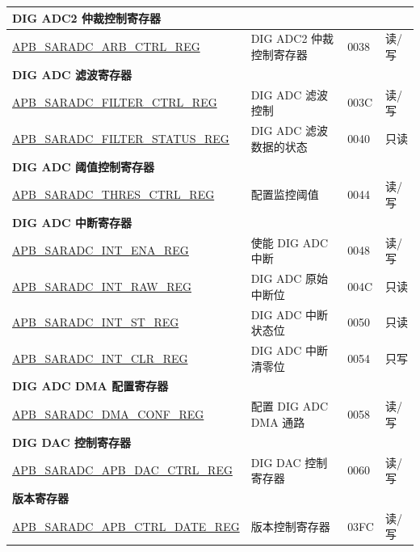 \begin{longtable}{ | p{6cm} | p{7.2cm} | p{1.3cm} | p{1cm} | }
\multicolumn{4}{|l|}{\textbf{DIG ADC2 仲裁控制寄存器}} \\ \hline
\hyperref[regdesc:APBSARADCAPBADCARBCTRLREG]{APB\_SARADC\_ARB\_CTRL\_REG} & DIG ADC2 仲裁控制寄存器 & \hexprefix{}0038 & 读/写 \\ \hline
\multicolumn{4}{|l|}{\textbf{DIG ADC 滤波寄存器}} \\ \hline
\hyperref[regdesc:APBSARADCFILTERCTRLREG]{APB\_SARADC\_FILTER\_CTRL\_REG} & DIG ADC 滤波控制 & \hexprefix{}003C & 读/写 \\ \hline
\hyperref[regdesc:APBSARADCFILTERSTATUSREG]{APB\_SARADC\_FILTER\_STATUS\_REG} & DIG ADC 滤波数据的状态 & \hexprefix{}0040 & 只读 \\ \hline
\multicolumn{4}{|l|}{\textbf{DIG ADC 阈值控制寄存器}} \\ \hline
\hyperref[regdesc:APBSARADCTHRESCTRLREG]{APB\_SARADC\_THRES\_CTRL\_REG} & 配置监控阈值 & \hexprefix{}0044 & 读/写 \\ \hline
\multicolumn{4}{|l|}{\textbf{DIG ADC 中断寄存器}} \\ \hline
\hyperref[regdesc:APBSARADCINTENAREG]{APB\_SARADC\_INT\_ENA\_REG} & 使能 DIG ADC 中断 & \hexprefix{}0048 & 读/写 \\ \hline
\hyperref[regdesc:APBSARADCINTRAWREG]{APB\_SARADC\_INT\_RAW\_REG} & DIG ADC 原始中断位 & \hexprefix{}004C & 只读 \\ \hline
\hyperref[regdesc:APBSARADCINTSTREG]{APB\_SARADC\_INT\_ST\_REG} & DIG ADC 中断状态位 & \hexprefix{}0050 & 只读 \\ \hline
\hyperref[regdesc:APBSARADCINTCLRREG]{APB\_SARADC\_INT\_CLR\_REG} & DIG ADC 中断清零位 & \hexprefix{}0054 & 只写 \\ \hline
\multicolumn{4}{|l|}{\textbf{DIG ADC DMA 配置寄存器}} \\ \hline
\hyperref[regdesc:APBSARADCDMACONFREG]{APB\_SARADC\_DMA\_CONF\_REG} & 配置 DIG ADC DMA 通路 & \hexprefix{}0058 & 读/写 \\ \hline
\multicolumn{4}{|l|}{\textbf{DIG DAC 控制寄存器}} \\ \hline
\hyperref[regdesc:APBSARADCAPBDACCTRLREG]{APB\_SARADC\_APB\_DAC\_CTRL\_REG} & DIG DAC 控制寄存器 & \hexprefix{}0060 & 读/写 \\ \hline
\multicolumn{4}{|l|}{\textbf{版本寄存器}} \\ \hline
\hyperref[regdesc:APBSARADCAPBCTRLDATEREG]{APB\_SARADC\_APB\_CTRL\_DATE\_REG} & 版本控制寄存器 & \hexprefix{}03FC & 读/写 \\ \hline
\end{longtable}
